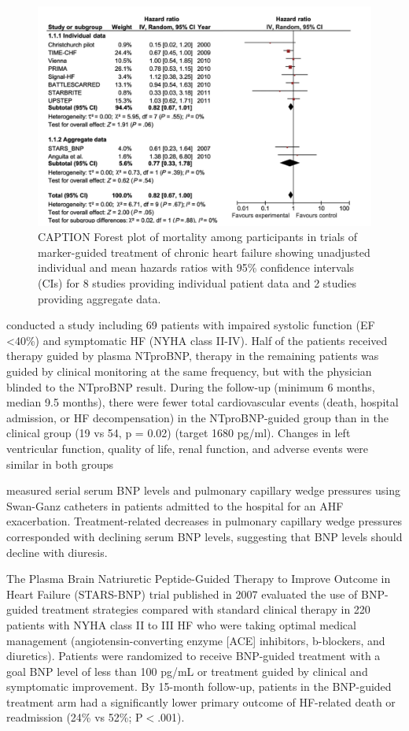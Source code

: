 \documentclass[14pt,a4paper,onecolumn]{extarticle}
\begin{document}
\begin{figure}   \includegraphics{../../images/NP_treatment.png}   \caption{CAPTION Forest plot of mortality among participants in trials of marker-guided treatment of chronic heart failure showing unadjusted individual and mean hazards ratios with 95\% confidence intervals (CIs) for 8 studies providing individual patient data and 2 studies providing aggregate data. \citep{Troughton2014}}   \label{NP_treatment} \end{figure}

\citep{Troughton2000} conducted a study including 69 patients with impaired systolic function (EF <40\%) and symptomatic HF (NYHA class II-IV). Half of the patients received therapy guided by plasma NTproBNP, therapy in the remaining patients was guided by clinical monitoring at the same frequency, but with the physician blinded to the NTproBNP result. During the follow-up (minimum 6 months, median 9.5 months), there were fewer total cardiovascular events (death, hospital admission, or HF decompensation) in the NTproBNP-guided group than in the clinical group (19 vs 54, p = 0.02) (target 1680 pg/ml). Changes in left ventricular function, quality of life, renal function, and adverse events were similar in both groups \citep{Troughton2000}

\citep{Kazanegra2001} measured serial serum BNP levels and pulmonary capillary wedge pressures using Swan-Ganz catheters in patients admitted to the hospital for an AHF exacerbation. Treatment-related decreases in pulmonary capillary wedge pressures corresponded with declining serum BNP levels, suggesting that BNP levels should decline with diuresis. %

The Plasma Brain Natriuretic Peptide-Guided Therapy to Improve Outcome in Heart Failure (STARS-BNP) trial published in 2007 evaluated the use of BNP-guided treatment strategies compared with standard clinical therapy in 220 patients with NYHA class II to III HF who were taking optimal medical management (angiotensin-converting enzyme [ACE] inhibitors, b-blockers, and diuretics). Patients were randomized to receive BNP-guided treatment with a goal BNP level of less than 100 pg/mL or treatment guided by clinical and symptomatic improvement. By 15-month follow-up, patients in the BNP-guided treatment arm had a significantly lower primary outcome of HF-related death or readmission (24\% vs 52\%; P$<$.001). \citep{Jourdain2007} %
\end{document}
